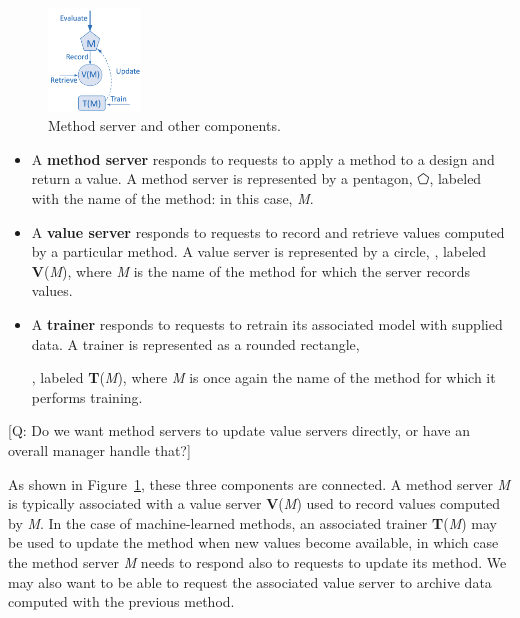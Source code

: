 \documentclass[10pt]{article}
\newcommand\q[1]{{\color{blue}[Q: #1]}}
\begin{document}
\begin{figure}
\vspace{-2ex}
  \centering
  \includegraphics[width=0.22\textwidth,trim=0in 0in 0in 0in,clip]{./Figs/servers.png}
  \vspace{-4ex}
  \caption{Method server and other components.
\label{fig:server}}
\end{figure}


\begin{itemize}
\itemsep-0.3em 
\item
A \textbf{method server} responds to requests to apply a method to a design and return a value. 
A method server is represented by a pentagon, $\pentagon$, labeled with the name of the method: in this case, \emph{M}. 
\item
A \textbf{value server} responds to requests to record and retrieve values computed by a particular method.
A value server is represented by a circle, \textbigcircle,
labeled \textbf{V}(\emph{M}), where \emph{M} is the name of the method for which the server records values.
\item
A \textbf{trainer} responds to requests to retrain its associated model with supplied data.
A trainer is represented as a rounded rectangle, , labeled \textbf{T}(\emph{M}),
where \emph{M} is once again the name of the method for which it performs training.
\end{itemize}

\q{Do we want method servers to update value servers directly, or have an overall manager handle that?}



As shown in Figure~\ref{fig:server}, these three components are connected. 
A method server \emph{M} is typically associated with a value server \textbf{V}(\emph{M}) used to record values computed by \emph{M}.
In the case of machine-learned methods, an associated trainer \textbf{T}(\emph{M}) may be used to update the method when new values become available,
in which case the method server \emph{M} needs to respond also to requests to update its method.
We may also want to be able to request the associated value server to archive data computed with the previous method.
\end{document}
